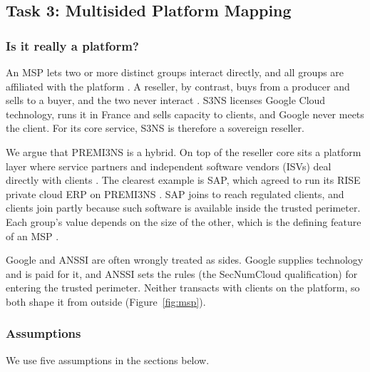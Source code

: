 \subsection{Task 3: Multisided Platform Mapping}
\label{sec:task3}

\subsubsection{Is it really a platform?}

An MSP lets two or more distinct groups interact directly, and all groups are affiliated with the platform \parencite[p.~150]{overby2021}. A reseller, by contrast, buys from a producer and sells to a buyer, and the two never interact \parencite[slide 40]{windekilde2026msp}. S3NS licenses Google Cloud technology, runs it in France and sells capacity to clients, and Google never meets the client. For its core service, S3NS is therefore a sovereign reseller.

We argue that PREMI3NS is a hybrid. On top of the reseller core sits a platform layer where service partners and independent software vendors (ISVs) deal directly with clients \parencite{s3nsecosystem}. The clearest example is SAP, which agreed to run its RISE private cloud ERP on PREMI3NS \parencite{thalessap2026}. SAP joins to reach regulated clients, and clients join partly because such software is available inside the trusted perimeter. Each group's value depends on the size of the other, which is the defining feature of an MSP \parencite[p.~150]{overby2021}.

Google and ANSSI are often wrongly treated as sides. Google supplies technology and is paid for it, and ANSSI sets the rules (the SecNumCloud qualification) for entering the trusted perimeter. Neither transacts with clients on the platform, so both shape it from outside (Figure~\ref{fig:msp}).

\subsubsection{Assumptions}

We use five assumptions in the sections below.

